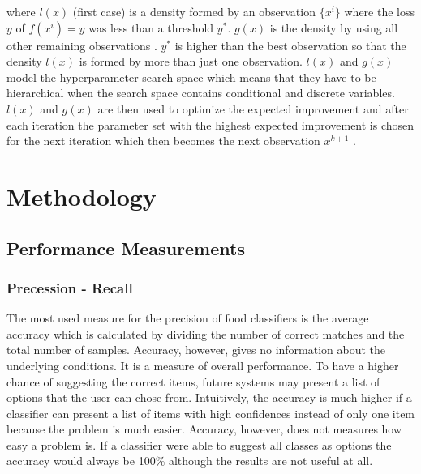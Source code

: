 where $l(x)$ {(first case)} is a density formed by an observation $\{x^i\}$ where the loss $y$ of $f(x^i)=y$ was less than a threshold $y^*$. $g(x)$ is the density by using all other remaining observations \cite{Bergstra2013a}. $y^*$ is higher than the best observation so that the density $l(x)$ is formed by more than just one observation. $l(x)$ and $g(x)$ model the hyperparameter search space which means that they have to be hierarchical when the search space contains conditional and discrete variables. $l(x)$ and $g(x)$ are then used to optimize the expected improvement and after each iteration the parameter set with the highest expected improvement is chosen for the next iteration which then becomes the next observation $x^{k+1}$ \cite{Bergstra2013a}. 
























\section{Methodology}
\subsection{Performance Measurements}

\subsubsection*{Precession - Recall}
The most used measure for the precision of food classifiers is the average accuracy which is calculated by dividing the number of correct matches and the total number of samples. Accuracy, however, gives no information about the underlying conditions. It is a measure of overall performance. To have a higher chance of suggesting the correct items, future systems may present a list of options that the user can chose from. Intuitively, the accuracy is much higher if a classifier can present a list of items with high confidences instead of only one item because the problem is much easier. Accuracy, however, does not measures how easy a problem is. If a classifier were able to suggest all classes as options the accuracy would always be 100\% although the results are not useful at all.

